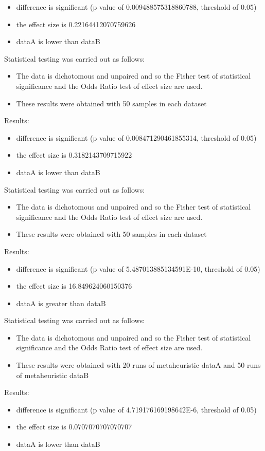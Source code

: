 \documentclass[]{article}
\begin{document}
\begin{itemize}
\item{difference is significant (p value of 0.009488575318860788, threshold of 0.05)}
\item{the effect size is 0.22164412070759626}
\item{dataA is lower than dataB}
\end{itemize}Statistical testing was carried out as follows: \begin{itemize}
\item{The data is dichotomous and unpaired and so the Fisher test of statistical significance and the Odds Ratio test of effect size are used.}
\item{These results were obtained with 50 samples in each dataset}
\end{itemize}Results:
\begin{itemize}
\item{difference is significant (p value of 0.008471290461855314, threshold of 0.05)}
\item{the effect size is 0.3182143709715922}
\item{dataA is lower than dataB}
\end{itemize}Statistical testing was carried out as follows: \begin{itemize}
\item{The data is dichotomous and unpaired and so the Fisher test of statistical significance and the Odds Ratio test of effect size are used.}
\item{These results were obtained with 50 samples in each dataset}
\end{itemize}Results:
\begin{itemize}
\item{difference is significant (p value of 5.487013885134591E-10, threshold of 0.05)}
\item{the effect size is 16.849624060150376}
\item{dataA is greater than dataB}
\end{itemize}Statistical testing was carried out as follows: \begin{itemize}
\item{The data is dichotomous and unpaired and so the Fisher test of statistical significance and the Odds Ratio test of effect size are used.}
\item{These results were obtained with 20 runs of metaheuristic dataA and 50 runs of metaheuristic dataB}
\end{itemize}Results:
\begin{itemize}
\item{difference is significant (p value of 4.719176169198642E-6, threshold of 0.05)}
\item{the effect size is 0.0707070707070707}
\item{dataA is lower than dataB}
\end{itemize}
\end{document}
